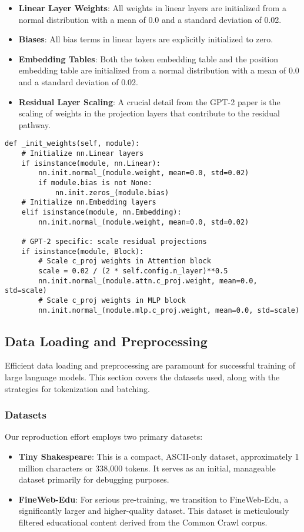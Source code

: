 \begin{itemize}
    \item \textbf{Linear Layer Weights}: All weights in linear layers are initialized from a normal distribution with a mean of 0.0 and a standard deviation of 0.02.
    \item \textbf{Biases}: All bias terms in linear layers are explicitly initialized to zero.
    \item \textbf{Embedding Tables}: Both the token embedding table and the position embedding table are initialized from a normal distribution with a mean of 0.0 and a standard deviation of 0.02.
    \item \textbf{Residual Layer Scaling}: A crucial detail from the GPT-2 paper is the scaling of weights in the projection layers that contribute to the residual pathway.
\end{itemize}

\begin{lstlisting}[caption={Custom Weight Initialization}]
def _init_weights(self, module):
    # Initialize nn.Linear layers
    if isinstance(module, nn.Linear):
        nn.init.normal_(module.weight, mean=0.0, std=0.02)
        if module.bias is not None:
            nn.init.zeros_(module.bias)
    # Initialize nn.Embedding layers
    elif isinstance(module, nn.Embedding):
        nn.init.normal_(module.weight, mean=0.0, std=0.02)

    # GPT-2 specific: scale residual projections
    if isinstance(module, Block):
        # Scale c_proj weights in Attention block
        scale = 0.02 / (2 * self.config.n_layer)**0.5
        nn.init.normal_(module.attn.c_proj.weight, mean=0.0, std=scale)
        # Scale c_proj weights in MLP block
        nn.init.normal_(module.mlp.c_proj.weight, mean=0.0, std=scale)
\end{lstlisting}

\subsection{Data Loading and Preprocessing}
Efficient data loading and preprocessing are paramount for successful training of large language models. This section covers the datasets used, along with the strategies for tokenization and batching.

\subsubsection{Datasets}
Our reproduction effort employs two primary datasets:
\begin{itemize}
    \item \textbf{Tiny Shakespeare}: This is a compact, ASCII-only dataset, approximately 1 million characters or 338,000 tokens. It serves as an initial, manageable dataset primarily for debugging purposes.
    \item \textbf{FineWeb-Edu}: For serious pre-training, we transition to FineWeb-Edu, a significantly larger and higher-quality dataset. This dataset is meticulously filtered educational content derived from the Common Crawl corpus.
\end{itemize}

